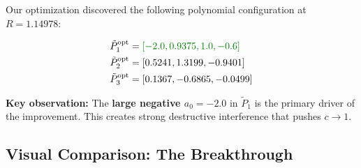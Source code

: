 \documentclass[11pt]{article}
\begin{document}
Our optimization discovered the following polynomial configuration at $R = 1.14978$:

\begin{align}
\tilde{P}_1^{\text{opt}} &= \textcolor{improvement}{[-2.0, 0.9375, 1.0, -0.6]} \\
\tilde{P}_2^{\text{opt}} &= [0.5241, 1.3199, -0.9401] \\
\tilde{P}_3^{\text{opt}} &= [0.1367, -0.6865, -0.0499]
\end{align}

\textbf{Key observation:} The \textcolor{improvement}{\textbf{large negative $a_0 = -2.0$}} in $\tilde{P}_1$ is the primary driver of the improvement. This creates strong destructive interference that pushes $c \to 1$.

\subsection{Visual Comparison: The Breakthrough}
\end{document}
